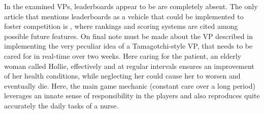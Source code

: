 In the examined VPs, leaderboards appear to be are completely absent. The only article that mentions leaderboards as a vehicle that could be implemented to foster competition is \cite{hirumi2016advancingPart2}, where rankings and scoring systems are cited among possible future features. 
On final note must be made about the VP described in \cite{adefila2020students} implementing the very peculiar idea of a Tamagotchi-style VP, that needs to be cared for in real-time over two weeks. Here caring for the patient, an elderly woman called Hollie, effectively and at regular intervals ensures an improvement of her health conditions, while neglecting her could cause her to worsen and eventually die. Here, the main game mechanic (constant care over a long period) leverages an innate sense of responsibility in the players and also reproduces quite accurately the daily tasks of a nurse. 



